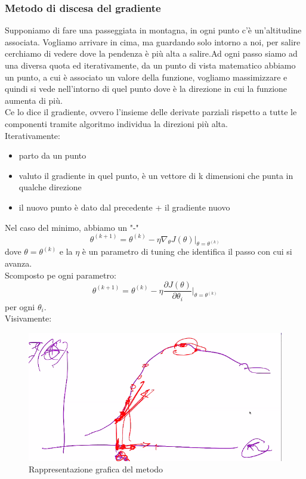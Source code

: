 \documentclass[12pt, oneside]{extbook}
\begin{document}
\subsubsection{Metodo di discesa del gradiente}
Supponiamo di fare una passeggiata in montagna, in ogni punto c'è un'altitudine associata. Vogliamo arrivare in cima, ma guardando solo intorno a noi, per salire cerchiamo di vedere dove la pendenza è più alta a salire.Ad ogni passo siamo ad una diversa quota ed iterativamente, da un punto di vista matematico abbiamo un punto, a cui è associato un valore della funzione, vogliamo massimizzare e quindi si vede nell'intorno di quel punto dove è la direzione in cui la funzione aumenta di più.\\Ce lo dice il gradiente, ovvero l'insieme delle derivate parziali rispetto a tutte le componenti tramite algoritmo individua la direzioni più alta.\\Iterativamente:
\begin{itemize}
	\item parto da un punto
	\item valuto il gradiente in quel punto, è un vettore di k dimensioni che punta in qualche direzione
	\item il nuovo punto è dato dal precedente + il gradiente nuovo
\end{itemize}
Nel caso del minimo, abbiamo un "-"
\begin{equation}
	\theta^{(k+1)} = \theta^{(k)} - \eta \nabla_{\theta} J(\theta) \bigg\rvert_{\theta = \theta^{(k)}}
\end{equation}
dove $\theta = \theta^{(k)}$ e la $\eta$ è un parametro di tuning che identifica il passo con cui si avanza.\\Scomposto pe ogni parametro:
\begin{equation}
	\theta^{(k+1)} = \theta^{(k)} - \eta \dfrac{\partial J(\theta)}{\partial \theta_i}\bigg\rvert_{\theta = \theta^{(k)}}
\end{equation}
per ogni $\theta_i$.\\Visivamente:\\
\begin{figure}
	\includegraphics[scale=0.6]{immagini/disc_gradiente.png}
	\caption{Rappresentazione grafica del metodo}
\end{figure}\\\\
\end{document}
